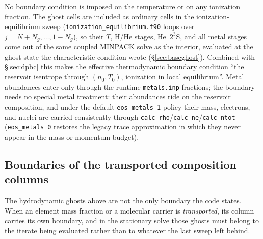 \documentclass[english,a4paper]{my_memo}
\begin{document}
No boundary condition is imposed on the temperature or on any
ionization fraction. The ghost cells are included as ordinary cells in
the ionization-equilibrium sweep
(\texttt{ionization\_equilibrium.f90} loops over
$j = N{+}N_g,\dots,1{-}N_g$), so their $T$, H/He stages, He~$2^3$S,
and all metal stages come out of the same coupled MINPACK solve as the
interior, evaluated at the ghost state the characteristic condition wrote
(\S\ref{sec:baseghost}). Combined with \S\ref{sec:dpbc} this makes the
effective thermodynamic boundary condition ``the reservoir isentrope through
$(n_0, T_0)$, ionization in local equilibrium''. Metal abundances enter only through
the runtime \texttt{metals.inp} fractions; the boundary needs no
special metal treatment: their abundances ride on the reservoir
composition, and under the default \texttt{eos\_metals 1} policy their
mass, electrons, and nuclei are carried consistently through
\texttt{calc\_rho}/\texttt{calc\_ne}/\texttt{calc\_ntot}
(\texttt{eos\_metals 0} restores the legacy trace approximation in
which they never appear in the mass or momentum budget).

\subsection{Boundaries of the transported composition columns}
\label{sec:transported-bc}

The hydrodynamic ghosts above are not the only boundary the code states. When
an element mass fraction or a molecular carrier is \emph{transported}, its
column carries its own boundary, and in the stationary solve those ghosts
must belong to the iterate being evaluated rather than to whatever the last
sweep left behind.
\end{document}

